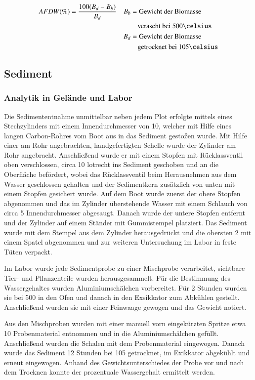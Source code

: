 \begin{align*}
 AFDW(\%)&=\frac{100(B_d-B_b)}{B_d} & B_b &=\text{Gewicht der Biomasse}\\ 
 & &     &\text{\quad verascht bei 500\celsius}\\
 & & B_d &=\text{Gewicht der Biomasse}\\
 & &     &\text{\quad getrocknet bei 105\celsius}\\
\end{align*}




\subsection{Sediment}
\subsubsection{Analytik in Gelände und Labor}
Die Sedimententnahme unmittelbar neben jedem Plot erfolgte mittels eines Stechzylinders mit einem Innendurchmesser von \unit{10}{\centi\metre}, welcher mit Hilfe eines langen Carbon-Rohres vom Boot aus in das Sediment gestoßen wurde. Mit Hilfe einer am Rohr angebrachten, handgefertigten Schelle wurde der Zylinder am Rohr angebracht. Anschließend wurde er mit einem Stopfen mit Rücklassventil oben verschlossen, circa \unit{10}{\centi\metre} lotrecht ins Sediment geschoben und an die Oberfläche befördert, wobei das Rücklassventil beim Herausnehmen aus dem Wasser geschlossen gehalten und der Sedimentkern zusätzlich von unten mit einem Stopfen gesichert wurde. Auf dem Boot wurde zuerst der obere Stopfen abgenommen und das im Zylinder überstehende Wasser mit einem Schlauch von circa \unit{5}{\milli\metre} Innendurchmesser abgesaugt. Danach wurde der untere Stopfen entfernt und der Zylinder auf einem Ständer mit Gummistempel platziert. Das Sediment wurde mit dem Stempel aus dem Zylinder herausgedrückt und die obersten \unit{2}{\centi\metre} mit einem Spatel abgenommen und zur weiteren Untersuchung im Labor in feste Tüten verpackt.

Im Labor wurde jede Sedimentprobe zu einer Mischprobe verarbeitet, sichtbare Tier- und Pflanzenteile wurden herausgesammelt. Für die Bestimmung des Wassergehaltes wurden Aluminiumschälchen vorbereitet. Für 2 Stunden wurden sie bei \unit{500}{\celsius} in den Ofen und danach in den Exsikkator zum Abkühlen gestellt. Anschließend wurden sie mit einer Feinwaage gewogen und das Gewicht notiert.

Aus den Mischproben wurden mit einer manuell vorn eingekürzten Spritze etwa \unit{10}{\milli\litre} Probenmaterial entnommen und in die Aluminiumschälchen gefüllt. Anschließend wurden die Schalen mit dem Probenmaterial eingewogen. Danach wurde das Sediment 12 Stunden bei \unit{105}{\celsius} getrocknet, im Exikkator abgekühlt und erneut eingewogen. Anhand des Gewichtsunterschiedes der Probe vor und nach dem Trocknen konnte der prozentuale Wassergehalt ermittelt werden.

